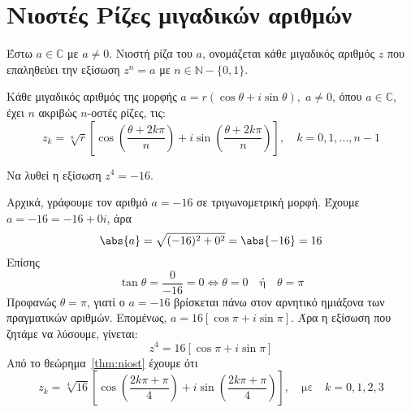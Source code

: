 \documentclass[a4paper,table]{report}
\begin{document}
\section*{Νιοστές Ρίζες μιγαδικών αριθμών}
\begin{mybox1}
  \begin{dfn}
    Έστω $ a \in \mathbb{C} $ με $ a \neq 0 $. \textcolor{Col1}{Νιοστή ρίζα} 
    του $a$, ονομάζεται κάθε μιγαδικός αριθμός $ z $ που επαληθεύει την εξίσωση 
    $ z^{n}=a $ με $ n \in \mathbb{N}- \{ 0,1 \} $.
  \end{dfn}
\end{mybox1}

\begin{mybox2}
  \begin{thm}\label{thm:niost}
    Κάθε μιγαδικός αριθμός της μορφής $a=r(\cos\theta+i\sin\theta), \; a\neq 0$,
    όπου $ a \in \mathbb{C} $, έχει $n$ ακριβώς $n$-οστές ρίζες, τις: 
    \[
      \boxed{z_{k}=\sqrt[n]{r}\left[ \cos\left(\frac{\theta+2k\pi}{n}\right)+i
      \sin\left(\frac{\theta+2k\pi}{n}\right) \right], \quad k=0,1,\ldots, n-1}
    \]
  \end{thm}
\end{mybox2}

\begin{example}
  Να λυθεί η εξίσωση $ z^{4} = -16 $. 
\end{example}
\begin{solution}
  Αρχικά, γράφουμε τον αριθμό $ a = -16 $ σε τριγωνομετρική μορφή. Έχουμε 
  $ a=-16=-16+0i $, άρα 
  \[ 
    \abs{a} = \sqrt{(-16)^{2}+0^2} = \abs{-16} = 16 
  \] 
  Επίσης
  \[
    \tan{\theta} = \frac{0}{-16} = 0 \Leftrightarrow \theta =0 \quad
    \text{ή} \quad \theta = \pi
  \] 
  Προφανώς $ \theta = \pi $, γιατί ο $a=-16$ βρίσκεται πάνω στον αρνητικό 
  ημιάξονα των πραγματικών αριθμών. Επομένως, $ a = 16[\cos{\pi} + i
  \sin{\pi}] $. Άρα η εξίσωση που ζητάμε να λύσουμε, γίνεται:
  \[
    z^{4} = 16 [\cos{\pi} + i \sin{\pi}] 
  \] 
  Από το θεώρημα~\ref{thm:niost} έχουμε ότι
  \[
    z_{k} = \sqrt[4]{16} \left[\cos{\left(\frac{2k \pi + \pi}{4}\right)} + i
    \sin{\left(\frac{2k \pi + \pi}{ 4}\right)}\right], 
    \quad \text{με} \quad k=0,1,2,3
  \] 
\end{solution}

\end{document}
